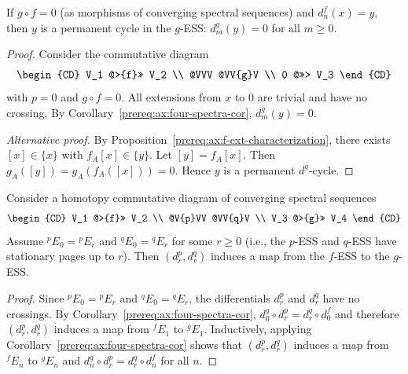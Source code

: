 \begin{axiom}\label{prereq:ax:composition-zero}
    \notready
    If $g \circ f = 0$ (as morphisms of converging spectral sequences) and $d_n^f(x) = y$, then $y$ is a permanent cycle in the $g$-ESS: $d_m^g(y) = 0$ for all $m \ge 0$.
\end{axiom}
\begin{proof}\leanok
    Consider the commutative diagram
    $$\begin{CD}
    V_1 @>{f}>> V_2 \\
    @VVV @VV{g}V \\
    0 @>>> V_3
    \end{CD}$$
    with $p = 0$ and $g \circ f = 0$. All extensions from $x$ to $0$ are trivial and have no crossing. By Corollary~\ref{prereq:ax:four-spectra-cor}, $d_m^g(y) = 0$.

    \emph{Alternative proof.} By Proposition~\ref{prereq:ax:f-ext-characterization}, there exists $[x] \in \{x\}$ with $f_A[x] \in \{y\}$. Let $[y] = f_A[x]$. Then $g_A([y]) = g_A(f_A([x])) = 0$. Hence $y$ is a permanent $d^g$-cycle.
\end{proof}

\begin{axiom}\label{prereq:ax:ess-naturality}
    \leanok
    Consider a homotopy commutative diagram of converging spectral sequences
    $$\begin{CD}
    V_1 @>{f}>> V_2 \\
    @V{p}VV @VV{q}V \\
    V_3 @>{g}>> V_4
    \end{CD}$$
    Assume ${}^{p}\!E_0 = {}^{p}\!E_r$ and ${}^{q}\!E_0 = {}^{q}\!E_r$ for some $r \ge 0$ (i.e., the $p$-ESS and $q$-ESS have stationary pages up to $r$). Then $(d_r^p, d_r^q)$ induces a map from the $f$-ESS to the $g$-ESS.
\end{axiom}
\begin{proof}\leanok
    Since ${}^{p}\!E_0 = {}^{p}\!E_r$ and ${}^{q}\!E_0 = {}^{q}\!E_r$, the differentials $d_r^p$ and $d_r^q$ have no crossings. By Corollary~\ref{prereq:ax:four-spectra-cor}, $d_0^g \circ d_r^p = d_r^q \circ d_0^f$ and therefore $(d_r^p, d_r^q)$ induces a map from ${}^{f}\!E_1$ to ${}^{g}\!E_1$. Inductively, applying Corollary~\ref{prereq:ax:four-spectra-cor} shows that $(d_r^p, d_r^q)$ induces a map from ${}^{f}\!E_n$ to ${}^{g}\!E_n$ and $d_n^g \circ d_r^p = d_r^q \circ d_n^f$ for all $n$.
\end{proof}


